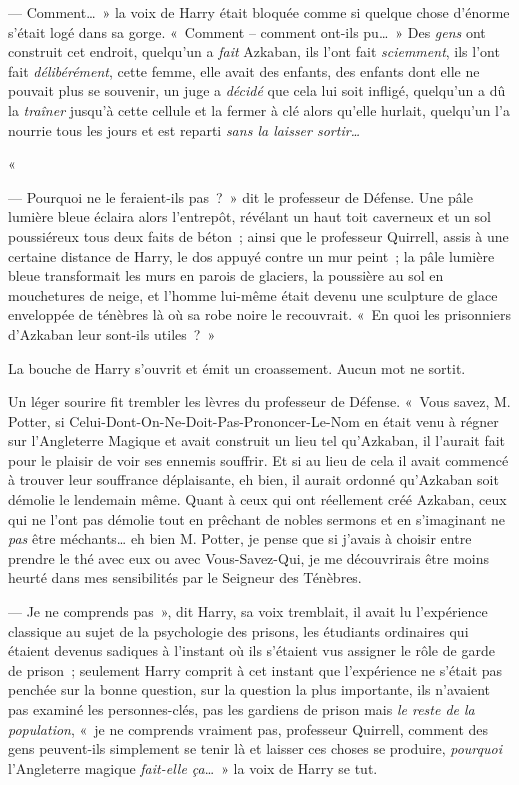 --- Comment…~» la voix de Harry était bloquée comme si quelque chose d'énorme s'était logé dans sa gorge. «~Comment -- comment ont-ils pu…~» Des \emph{gens} ont construit cet endroit, quelqu'un a \emph{fait} Azkaban, ils l'ont fait \emph{sciemment}, ils l'ont fait \emph{délibérément}, cette femme, elle avait des enfants, des enfants dont elle ne pouvait plus se souvenir, un juge a \emph{décidé} que cela lui soit infligé, quelqu'un a dû la \emph{traîner} jusqu'à cette cellule et la fermer à clé alors qu'elle hurlait, quelqu'un l'a nourrie tous les jours et est reparti \emph{sans la laisser sortir…}

«~

--- Pourquoi ne le feraient-ils pas~?~» dit le professeur de Défense. Une pâle lumière bleue éclaira alors l'entrepôt, révélant un haut toit caverneux et un sol poussiéreux tous deux faits de béton~; ainsi que le professeur Quirrell, assis à une certaine distance de Harry, le dos appuyé contre un mur peint~; la pâle lumière bleue transformait les murs en parois de glaciers, la poussière au sol en mouchetures de neige, et l'homme lui-même était devenu une sculpture de glace enveloppée de ténèbres là où sa robe noire le recouvrait. «~En quoi les prisonniers d'Azkaban leur sont-ils utiles~?~»

La bouche de Harry s'ouvrit et émit un croassement. Aucun mot ne sortit.

Un léger sourire fit trembler les lèvres du professeur de Défense. «~Vous savez, M. Potter, si Celui-Dont-On-Ne-Doit-Pas-Prononcer-Le-Nom en était venu à régner sur l'Angleterre Magique et avait construit un lieu tel qu'Azkaban, il l'aurait fait pour le plaisir de voir ses ennemis souffrir. Et si au lieu de cela il avait commencé à trouver leur souffrance déplaisante, eh bien, il aurait ordonné qu'Azkaban soit démolie le lendemain même. Quant à ceux qui ont réellement créé Azkaban, ceux qui ne l'ont pas démolie tout en prêchant de nobles sermons et en s'imaginant ne \emph{pas} être méchants… eh bien M. Potter, je pense que si j'avais à choisir entre prendre le thé avec eux ou avec Vous-Savez-Qui, je me découvrirais être moins heurté dans mes sensibilités par le Seigneur des Ténèbres.

--- Je ne comprends pas~», dit Harry, sa voix tremblait, il avait lu l'expérience classique au sujet de la psychologie des prisons, les étudiants ordinaires qui étaient devenus sadiques à l'instant où ils s'étaient vus assigner le rôle de garde de prison~; seulement Harry comprit à cet instant que l'expérience ne s'était pas penchée sur la bonne question, sur la question la plus importante, ils n'avaient pas examiné les personnes-clés, pas les gardiens de prison mais \emph{le reste de la population}, «~je ne comprends vraiment pas, professeur Quirrell, comment des gens peuvent-ils simplement se tenir là et laisser ces choses se produire, \emph{pourquoi} l'Angleterre magique \emph{fait-elle ça}…~» la voix de Harry se tut.

